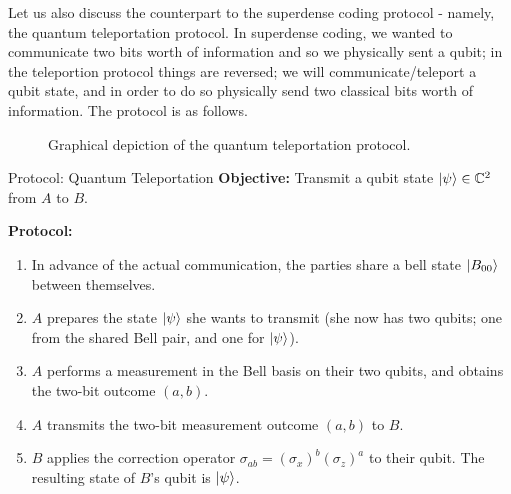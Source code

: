 Let us also discuss the counterpart to the superdense coding protocol - namely, the quantum teleportation protocol. In superdense coding, we wanted to communicate two bits worth of information and so we physically sent a qubit; in the teleportion protocol things are reversed; we will communicate/teleport a qubit state, and in order to do so physically send two classical bits worth of information. The protocol is as follows.

\begin{figure}[htbp]
    \centering
    \caption{Graphical depiction of the quantum teleportation protocol.}
    \label{fig-teleportation}
\end{figure}

\begin{blankbox}{Protocol: Quantum Teleportation}
    \textbf{Objective:} Transmit a qubit state $\lvert \psi \rangle \in \mathbb{C}^2$ from $A$ to $B$.

    \noindent
    \textbf{Protocol:}
    \begin{enumerate}
        \item In advance of the actual communication, the parties share a bell state $\lvert B_{00} \rangle$ between themselves.
        \item $A$ prepares the state $\lvert \psi \rangle$ she wants to transmit (she now has two qubits; one from the shared Bell pair, and one for $\lvert \psi \rangle$).
        \item $A$ performs a measurement in the Bell basis on their two qubits, and obtains the two-bit outcome $(a, b)$. 
        \item $A$ transmits the two-bit measurement outcome $(a, b)$ to $B$.
        \item $B$ applies the correction operator $\sigma_{ab} = (\sigma_x)^b(\sigma_z)^a$ to their qubit. The resulting state of $B$'s qubit is $\lvert \psi \rangle$.
    \end{enumerate}
\end{blankbox}

